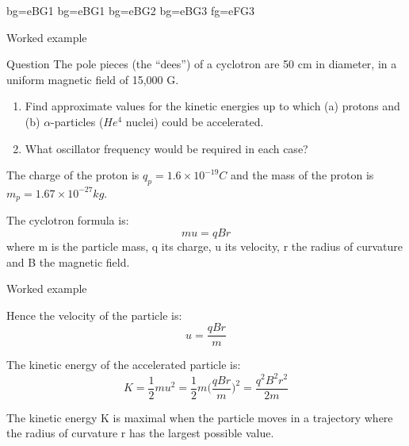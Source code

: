 %
%

{
 {bg=eBG1}
 {bg=eBG1}
 {bg=eBG2}
 {bg=eBG3}
 {fg=eFG3}

%
%
%

\begin{frame}{Worked example}

\begin{blockexmplque}{Question}
The pole pieces (the ``dees'') of a cyclotron are 50 cm in diameter, in a uniform magnetic field of 15,000 G.
\begin{enumerate}
  \item Find approximate values for the kinetic energies up to which
            (a) protons and (b) $\alpha$-particles ($He^{4}$ nuclei) could be accelerated.
  \item What oscillator frequency would be required in each case?
\end{enumerate}
The charge of the proton is $q_p = 1.6 \times 10^{-19} C$ and the mass of the proton is $m_p = 1.67 \times 10^{-27} kg$.
\end{blockexmplque}
\vspace{0.4cm}

The cyclotron formula is:
\begin{equation*}
  m u = q B r
\end{equation*}
where m is the particle mass, q its charge, u its velocity, r the radius of curvature and B the magnetic field.

\end{frame}

%
%
%

\begin{frame}{Worked example}

Hence the velocity of the particle is:
\begin{equation*}
  u = \frac{q B r}{m}
\end{equation*}

The kinetic energy of the accelerated particle is:
\begin{equation*}
  K = \frac{1}{2} m u^2 = \frac{1}{2} m \Big( \frac{q B r}{m} \Big)^2 =  \frac{q^2 B^2 r^2}{2m}
\end{equation*}

The kinetic energy K is maximal when the particle moves in a trajectory where the radius of curvature r
has the largest possible value. \\
\vspace{0.2cm}


\end{frame}}
